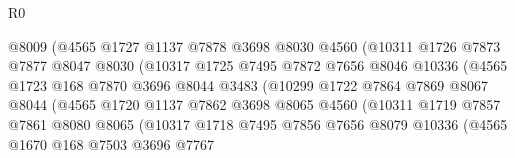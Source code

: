 \begin{lexlean}{R0}
\begin{coremodule}
                            @8009
                            (@4565
                              @1727
                              @1137
                              @7878
                              @3698
                              @8030
                              @4560
                              (@10311
                                @1726
                                @7873
                                @7877
                                @8047
                                @8030
                                (@10317
                                  @1725
                                  @7495
                                  @7872
                                  @7656
                                  @8046
                                  @10336
                                  (@4565
                                    @1723
                                    @168
                                    @7870
                                    @3696
                                    @8044
                                    @3483
                                    (@10299
                                      @1722
                                      @7864
                                      @7869
                                      @8067
                                      @8044
                                      (@4565
                                        @1720
                                        @1137
                                        @7862
                                        @3698
                                        @8065
                                        @4560
                                        (@10311
                                          @1719
                                          @7857
                                          @7861
                                          @8080
                                          @8065
                                          (@10317
                                            @1718
                                            @7495
                                            @7856
                                            @7656
                                            @8079
                                            @10336
                                            (@4565
                                              @1670
                                              @168
                                              @7503
                                              @3696
                                              @7767

\end{coremodule}
\end{lexlean}

